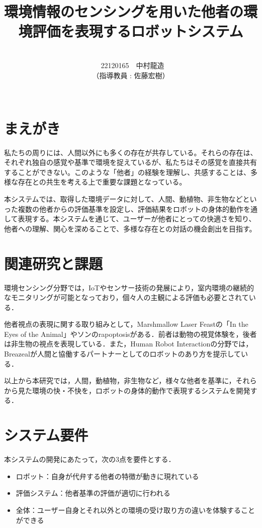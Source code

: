 \documentclass[paper=a4paper,jafontsize=9pt,head_space=15mm,gutter=20mm,
twocolumn,number_of_lines=49, line_length=26zw]{myuarticle}
\begin{document}
\title{{\LARGE\bfseries\gtfamily 環境情報のセンシングを用いた他者の環境評価を表現するロボットシステム}}
\author{\\\ 22120165　中村龍造 \\ （指導教員 : 佐藤宏樹）\\ \\}
\date{}
\maketitle

\section{まえがき}
私たちの周りには、人間以外にも多くの存在が共存している。それらの存在は、それぞれ独自の感覚や基準で環境を捉えているが、私たちはその感覚を直接共有することができない。このような「他者」の経験を理解し、共感することは、多様な存在との共生を考える上で重要な課題となっている。

本システムでは、取得した環境データに対して、人間、動植物、非生物などといった複数の他者からの評価基準を設定し、評価結果をロボットの身体的動作を通して表現する。本システムを通じて、ユーザーが他者にとっての快適さを知り、他者への理解、関心を深めることで、多様な存在との対話の機会創出を目指す。

\section{関連研究と課題}

環境センシング分野では，IoTやセンサー技術の発展により，室内環境の継続的なモニタリングが可能となっており\cite{Saini-2020-IndoorAirQualityMonitoring}，個々人の主観による評価も必要とされている\cite{Coulby-2020-ScopingReviewTechnologicalApproaches}．

他者視点の表現に関する取り組みとして，Marshmallow Laser Feastの「In the Eyes of the Animal」\cite{Dezeen-2015-MarshmallowLaserFeastsEyes}やソンのrapoptosis\cite{--ソンヨン}がある．前者は動物の視覚体験を，後者は非生物の視点を表現している．また，Human Robot Interactionの分野では，Breazeal\cite{C.Breazeal-2004-SocialInteractionsHRIRobot}が人間と協働するパートナーとしてのロボットのあり方を提示している．

以上から本研究では，人間，動植物，非生物など，様々な他者を基準に，それらから見た環境の快・不快を，ロボットの身体的動作で表現するシステムを開発する．

\section{システム要件}
本システムの開発にあたって，次の3点を要件とする．
\begin{itemize}
  \item ロボット：自身が代弁する他者の特徴が動きに現れている
  \item 評価システム：他者基準の評価が適切に行われる
  \item 全体：ユーザー自身とそれ以外との環境の受け取り方の違いを体験することができる
\end{itemize}
\end{document}
